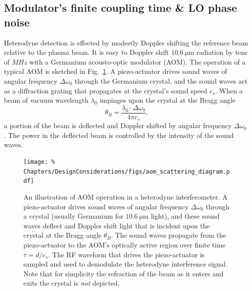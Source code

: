 \subsection{Modulator's finite coupling time \& LO phase noise}
\label{sec:DesignConsiderations:phase_noise:LO}
Heterodyne detection is effected by
modestly Doppler shifting the reference beam
relative to the plasma beam.
It is easy to Doppler shift $\SI{10.6}{\micro\meter}$ radiation
by tens of $MHz$ with a Germanium acousto-optic modulator (AOM).
The operation of a typical AOM is sketched in
Fig.~\ref{fig:DesignConsiderations:aom_scattering_diagram}.
A piezo-actuator drives sound waves
of angular frequency $\Delta \omega_0$
through the Germanium crystal, and
the sound waves act as a diffraction grating
that propagates at the crystal's sound speed $c_s$.
When a beam of vacuum wavelength $\lambda_0$
impinges upon the crystal at the Bragg angle
\graffito{\textcolor{red}{comment about Bragg regime criterion from Ch.~2?}}
\begin{equation}
  \theta_B = \frac{\lambda_0 \cdot \Delta \omega_0}{4 \pi c_s},
  \label{eq:DesignConsiderations:Bragg_angle}
\end{equation}
a portion of the beam is deflected and
Doppler shifted by angular frequency $\Delta \omega_0$
\cite[Sec.~20.1]{saleh_and_teich}.
The power in the deflected beam
is controlled by the intensity of the sound waves.

\begin{figure}
  \centering
  \texttt{[image: \%
    Chapters/DesignConsiderations/figs/aom\_scattering\_diagram.pdf]}
  \caption[Illustration of AOM operation in a heterodyne interferometer]{%
    An illustration of AOM operation in a heterodyne interferometer.
    A piezo-actuator drives sound waves of angular frequency $\Delta \omega_0$
    through a crystal (usually Germanium for $\SI{10.6}{\micro\meter}$ light),
    and these sound waves deflect and Doppler shift light
    that is incident upon the crystal at the Bragg angle $\theta_B$.
    The sound waves propagate from the piezo-actuator
    to the AOM's optically active region
    over finite time $\tau = d / c_s$.
    The RF waveform that drives the piezo-actuator
    is sampled and used to demodulate the heterodyne interference signal.
    Note that for simplicity the refraction of the beam
    as it enters and exits the crystal is \emph{not} depicted.}
\label{fig:DesignConsiderations:aom_scattering_diagram}
\end{figure}

